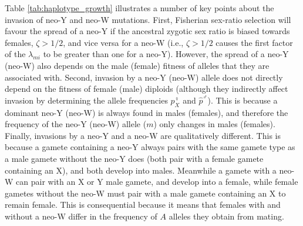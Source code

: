 \documentclass[12pt]{article}
\begin{document}
Table \ref{tab:haplotype_growth} illustrates a number of key points about the invasion of neo-Y and neo-W mutations. 
First, Fisherian sex-ratio selection will favour the spread of a neo-Y if the ancestral zygotic sex ratio is biased towards females, $\zeta>1/2$, and vice versa for a neo-W (i.e., $\zeta>1/2$ causes the first factor of the $\lambda_{mi}$ to be greater than one for a neo-Y).
However, the spread of a neo-Y (neo-W) also depends on the male (female) fitness of alleles that they are associated with. %
Second, invasion by a neo-Y (neo-W) allele does not directly depend on the fitness of female (male) diploids (although they indirectly affect invasion by determining the allele frequencies $p^\female_X$ and $\hat{p}^\male$).
This is because a dominant neo-Y (neo-W) is always found in males (females), and therefore the frequency of the neo-Y (neo-W) allele ($m$) only changes in males (females). 
Finally, invasions by a neo-Y and a neo-W are qualitatively different.
This is because a gamete containing a neo-Y always pairs with the same gamete type as a male gamete without the neo-Y does (both pair with a female gamete containing an X), and both develop into males.
Meanwhile a gamete with a neo-W can pair with an X or Y male gamete, and develop into a female, while female gametes without the neo-W must pair with a male gamete containing an X to remain female.
This is consequential because it means that females with and without a neo-W differ in the frequency of $A$ alleles they obtain from mating.
\end{document}
